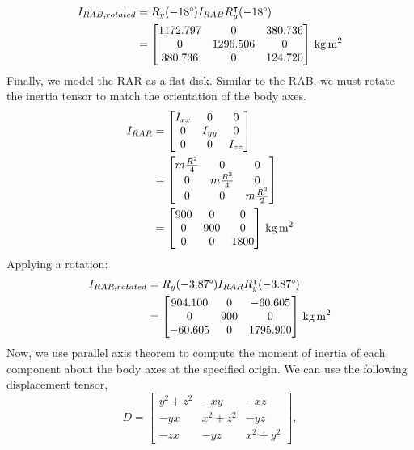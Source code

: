 \begin{align*}
I_{RAB,rotated} &= R_{y}(-18\degree) I_{RAB} R_{y}^{\intercal}(-18\degree) \\
&=
\qty[parse-numbers = false]{
\begin{bmatrix}
1172.797 & 0 & 380.736 \\
0 & 1296.506 & 0 \\
380.736 & 0 & 124.720
\end{bmatrix}
}{\kilogram\metre\squared}
\end{align*}
Finally, we model the RAR as a flat disk. Similar to the RAB, we must rotate the inertia tensor to match the orientation of the body axes.
\begin{align*}
I_{RAR} &=
\begin{bmatrix}
I_{xx} & 0 & 0 \\
0 & I_{yy} & 0 \\
0 & 0 & I_{zz}
\end{bmatrix} \\
&=
\begin{bmatrix}
m \frac{R^{2}}{4} & 0 & 0 \\
0 & m \frac{R^{2}}{4} & 0 \\
0 & 0 & m \frac{R^{2}}{2} 
\end{bmatrix} \\
&=
\qty[parse-numbers = false]{
\begin{bmatrix}
900 & 0 & 0 \\
0 & 900 & 0 \\
0 & 0 & 1800 
\end{bmatrix}
}{\kilogram\metre\squared}
\end{align*}
Applying a rotation:
\begin{align*}
I_{RAR,rotated} &= R_{y}(-3.87\degree) I_{RAR} R_{y}^{\intercal}(-3.87\degree) \\
&=
\qty[parse-numbers = false]{
\begin{bmatrix}
904.100 & 0 & -60.605 \\
0 & 900 & 0 \\
-60.605 & 0 & 1795.900
\end{bmatrix}
}{\kilogram\metre\squared}
\end{align*}
Now, we use parallel axis theorem to compute the moment of inertia of each component about the body axes at the specified origin. We can use the following displacement tensor,
\begin{equation*}
D =
\begin{bmatrix}
y^{2} + z^{2} & -xy & -xz \\
-yx & x^{2} + z^{2} & -yz \\
-zx & -yz & x^{2} + y^{2}
\end{bmatrix},
\end{equation*}

